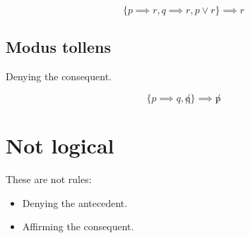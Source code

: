 \documentclass[letterpaper,10pt]{article}
\begin{document}
\begin{equation*}
 \{p \implies r, q \implies r, p \lor r\} \implies r
\end{equation*}

\subsection{Modus tollens}

Denying the consequent.

\begin{equation*}
 \{p \implies q, \not q\} \implies \not p
\end{equation*}

\section{Not logical}
These are not rules:

\begin{itemize}
 \item Denying the antecedent.
 \item Affirming the consequent.
\end{itemize}
\end{document}
